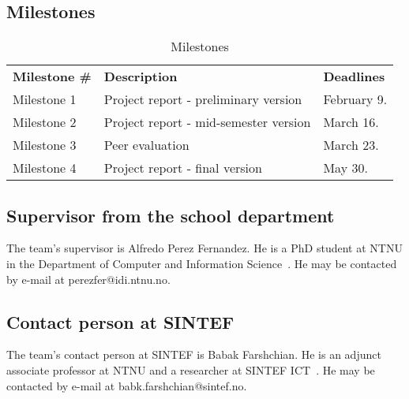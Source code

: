 \subsection{Milestones}
\begin{table}[H]
\centering
{}
\begin{tabular}{|l|l|l|}
\hline
\textbf{Milestone \#} & \textbf{Description} & \textbf{Deadlines}\\
Milestone 1& Project report - preliminary version & February 9. \\
Milestone 2 & Project report - mid-semester version & March 16.  \\
Milestone 3 & Peer evaluation & March 23.  \\
 Milestone 4 & Project report - final version & May 30.\\\hline
\end{tabular}
\caption{Milestones}
\end{table}

\subsection{Supervisor from the school department}
The team's supervisor is Alfredo Perez Fernandez. He is a PhD student at NTNU in the Department of Computer and Information Science~\cite{idi}. He may be contacted by e-mail at perezfer@idi.ntnu.no.

\subsection{Contact person at SINTEF}
The team's contact person at SINTEF is Babak Farshchian. He is an adjunct associate professor at NTNU and a researcher at SINTEF ICT~\cite{sintefict}. He may be contacted by e-mail at babk.farshchian@sintef.no.
